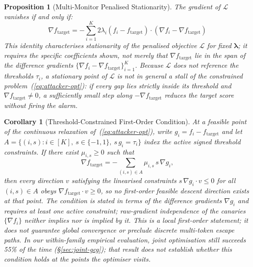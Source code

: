 \documentclass{article}
\newtheorem{proposition}{Proposition}
\newtheorem{corollary}{Corollary}
\begin{document}
\begin{proposition}[Multi-Monitor Penalised Stationarity]
\label{prop:multi-stall}
The gradient of $\mathcal{L}$ vanishes if and only if:
\begin{equation}
\nabla f_\text{target} = -\sum_{i=1}^K 2\lambda_i (f_i - f_\text{target}) \cdot (\nabla f_i - \nabla f_\text{target})
\end{equation}
This identity characterises stationarity of the penalised objective $\mathcal{L}$ for fixed $\boldsymbol{\lambda}$; it requires the specific coefficients shown, not merely that $\nabla f_\text{target}$ lie in the span of the difference gradients $\{\nabla f_i - \nabla f_\text{target}\}_{i=1}^K$. Because $\mathcal{L}$ does not reference the thresholds $\tau_i$, a stationary point of $\mathcal{L}$ is not in general a stall of the constrained problem~(\ref{eq:attacker-opt}): if every gap lies strictly inside its threshold and $\nabla f_\text{target} \neq 0$, a sufficiently small step along $-\nabla f_\text{target}$ reduces the target score without firing the alarm.
\end{proposition}

\begin{corollary}[Threshold-Constrained First-Order Condition]
At a feasible point of the continuous relaxation of~(\ref{eq:attacker-opt}), write $g_i = f_i - f_\text{target}$ and let $A = \{(i,s) : i \in [K],\ s \in \{-1,1\},\ s\,g_i = \tau_i\}$ index the active signed threshold constraints. If there exist $\mu_{i,s} \geq 0$ such that
\begin{equation}
\nabla f_\text{target} = -\sum_{(i,s) \in A} \mu_{i,s}\, s\, \nabla g_i ,
\end{equation}
then every direction $v$ satisfying the linearised constraints $s\,\nabla g_i \cdot v \leq 0$ for all $(i,s) \in A$ obeys $\nabla f_\text{target} \cdot v \geq 0$, so no first-order feasible descent direction exists at that point. The condition is stated in terms of the difference gradients $\nabla g_i$ and requires at least one active constraint; raw-gradient independence of the canaries $\{\nabla f_i\}$ neither implies nor is implied by it. This is a local first-order statement; it does not guarantee global convergence or preclude discrete multi-token escape paths. In our within-family empirical evaluation, joint optimisation still succeeds 55\% of the time (\S\ref{sec:joint-gcg}); that result does not establish whether this condition holds at the points the optimiser visits.
\end{corollary}
\end{document}
